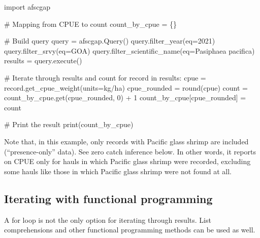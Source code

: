 \documentclass[
  letterpaper,
  oneside,
  open=any]{scrbook}
\newenvironment{Shaded}{\begin{snugshade}}{\end{snugshade}}
\newcommand{\AttributeTok}[1]{\textcolor[rgb]{0.40,0.45,0.13}{#1}}
\newcommand{\CommentTok}[1]{\textcolor[rgb]{0.37,0.37,0.37}{#1}}
\newcommand{\ControlFlowTok}[1]{\textcolor[rgb]{0.00,0.23,0.31}{#1}}
\newcommand{\DecValTok}[1]{\textcolor[rgb]{0.68,0.00,0.00}{#1}}
\newcommand{\FunctionTok}[1]{\textcolor[rgb]{0.28,0.35,0.67}{#1}}
\newcommand{\NormalTok}[1]{\textcolor[rgb]{0.00,0.23,0.31}{#1}}
\newcommand{\OtherTok}[1]{\textcolor[rgb]{0.00,0.23,0.31}{#1}}
\newcommand{\SpecialCharTok}[1]{\textcolor[rgb]{0.37,0.37,0.37}{#1}}
\newcommand{\StringTok}[1]{\textcolor[rgb]{0.13,0.47,0.30}{#1}}
\begin{document}
\begin{Shaded}
\begin{Highlighting}[]
\NormalTok{import afscgap}

\CommentTok{\# Mapping from CPUE to count}
\NormalTok{count\_by\_cpue }\OtherTok{=}\NormalTok{ \{\}}

\CommentTok{\# Build query}
\NormalTok{query }\OtherTok{=} \FunctionTok{afscgap.Query}\NormalTok{()}
\FunctionTok{query.filter\_year}\NormalTok{(}\AttributeTok{eq=}\DecValTok{2021}\NormalTok{)}
\FunctionTok{query.filter\_srvy}\NormalTok{(}\AttributeTok{eq=}\StringTok{\textquotesingle{}GOA\textquotesingle{}}\NormalTok{)}
\FunctionTok{query.filter\_scientific\_name}\NormalTok{(}\AttributeTok{eq=}\StringTok{\textquotesingle{}Pasiphaea pacifica\textquotesingle{}}\NormalTok{)}
\NormalTok{results }\OtherTok{=} \FunctionTok{query.execute}\NormalTok{()}

\CommentTok{\# Iterate through results and count}
\ControlFlowTok{for}\NormalTok{ record }\ControlFlowTok{in}\NormalTok{ results}\SpecialCharTok{:}
\NormalTok{  cpue }\OtherTok{=} \FunctionTok{record.get\_cpue\_weight}\NormalTok{(}\AttributeTok{units=}\StringTok{\textquotesingle{}kg/ha\textquotesingle{}}\NormalTok{)}
\NormalTok{  cpue\_rounded }\OtherTok{=} \FunctionTok{round}\NormalTok{(cpue)}
\NormalTok{  count }\OtherTok{=} \FunctionTok{count\_by\_cpue.get}\NormalTok{(cpue\_rounded, }\DecValTok{0}\NormalTok{) }\SpecialCharTok{+} \DecValTok{1}
\NormalTok{  count\_by\_cpue[cpue\_rounded] }\OtherTok{=}\NormalTok{ count}

\CommentTok{\# Print the result}
\FunctionTok{print}\NormalTok{(count\_by\_cpue)}
\end{Highlighting}
\end{Shaded}

Note that, in this example, only records with Pacific glass shrimp are
included (``presence-only'' data). See zero catch inference below. In
other words, it reports on CPUE only for hauls in which Pacific glass
shrimp were recorded, excluding some hauls like those in which Pacific
glass shrimp were not found at all.

\hypertarget{iterating-with-functional-programming}{%
\subsection{Iterating with functional
programming}\label{iterating-with-functional-programming}}

A for loop is not the only option for iterating through results. List
comprehensions and other functional programming methods can be used as
well.
\end{document}
